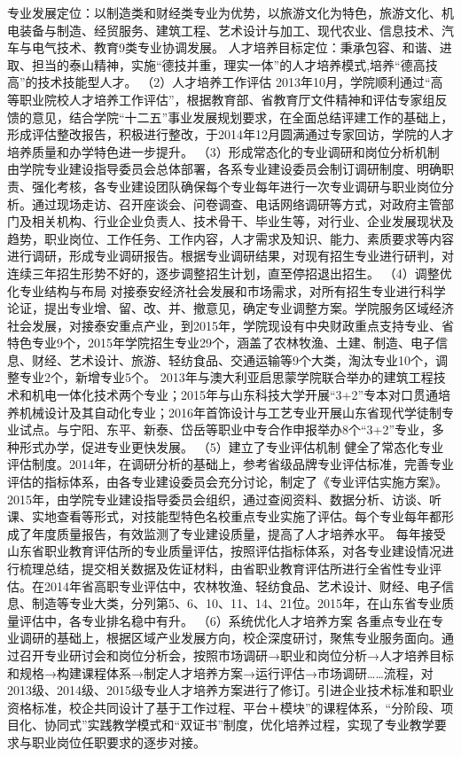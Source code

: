 专业发展定位：以制造类和财经类专业为优势，以旅游文化为特色，旅游文化、机电装备与制造、经贸服务、建筑工程、艺术设计与加工、现代农业、信息技术、汽车与电气技术、教育9类专业协调发展。
人才培养目标定位：秉承包容、和谐、进取、担当的泰山精神，实施“德技并重，理实一体”的人才培养模式,培养“德高技高”的技术技能型人才。
（2）人才培养工作评估
2013年10月，学院顺利通过“高等职业院校人才培养工作评估”，根据教育部、省教育厅文件精神和评估专家组反馈的意见，结合学院“十二五”事业发展规划要求，在全面总结评建工作的基础上，形成评估整改报告，积极进行整改，于2014年12月圆满通过专家回访，学院的人才培养质量和办学特色进一步提升。
（3）形成常态化的专业调研和岗位分析机制
由学院专业建设指导委员会总体部署，各系专业建设委员会制订调研制度、明确职责、强化考核，各专业建设团队确保每个专业每年进行一次专业调研与职业岗位分析。通过现场走访、召开座谈会、问卷调查、电话网络调研等方式，对政府主管部门及相关机构、行业企业负责人、技术骨干、毕业生等，对行业、企业发展现状及趋势，职业岗位、工作任务、工作内容，人才需求及知识、能力、素质要求等内容进行调研，形成专业调研报告。根据专业调研结果，对现有招生专业进行研判，对连续三年招生形势不好的，逐步调整招生计划，直至停招退出招生。
（4）调整优化专业结构与布局
对接泰安经济社会发展和市场需求，对所有招生专业进行科学论证，提出专业增、留、改、并、撤意见，确定专业调整方案。学院服务区域经济社会发展，对接泰安重点产业，到2015年，学院现设有中央财政重点支持专业、省特色专业9个，2015年学院招生专业29个，涵盖了农林牧渔、土建、制造、电子信息、财经、艺术设计、旅游、轻纺食品、交通运输等9个大类，淘汰专业10个，调整专业2个，新增专业5个。
2013年与澳大利亚启思蒙学院联合举办的建筑工程技术和机电一体化技术两个专业；2015年与山东科技大学开展“3+2”专本对口贯通培养机械设计及其自动化专业；2016年首饰设计与工艺专业开展山东省现代学徒制专业试点。与宁阳、东平、新泰、岱岳等职业中专合作申报举办8个“3+2”专业，多种形式办学，促进专业更快发展。
（5）建立了专业评估机制
健全了常态化专业评估制度。2014年，在调研分析的基础上，参考省级品牌专业评估标准，完善专业评估的指标体系，由各专业建设委员会充分讨论，制定了《专业评估实施方案》。2015年，由学院专业建设指导委员会组织，通过查阅资料、数据分析、访谈、听课、实地查看等形式，对技能型特色名校重点专业实施了评估。每个专业每年都形成了年度质量报告，有效监测了专业建设质量，提高了人才培养水平。
每年接受山东省职业教育评估所的专业质量评估，按照评估指标体系，对各专业建设情况进行梳理总结，提交相关数据及佐证材料，由省职业教育评估所进行全省性专业评估。在2014年省高职专业评估中，农林牧渔、轻纺食品、艺术设计、财经、电子信息、制造等专业大类，分列第5、6、10、11、14、21位。2015年，在山东省专业质量评估中，各专业排名稳中有升。
（6）系统优化人才培养方案 
各重点专业在专业调研的基础上，根据区域产业发展方向，校企深度研讨，聚焦专业服务面向。通过召开专业研讨会和岗位分析会，按照市场调研→职业和岗位分析→人才培养目标和规格→构建课程体系→制定人才培养方案→运行评估→市场调研……流程，对2013级、2014级、2015级专业人才培养方案进行了修订。引进企业技术标准和职业资格标准，校企共同设计了基于工作过程、平台＋模块”的课程体系，“分阶段、项目化、协同式”实践教学模式和“双证书”制度，优化培养过程，实现了专业教学要求与职业岗位任职要求的逐步对接。
